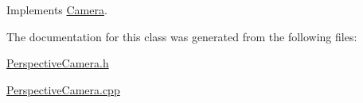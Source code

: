 Implements \hyperlink{classCamera_a8f4824f47acc2ef1b7724e7412abc2da}{Camera}.



The documentation for this class was generated from the following files\+:\begin{DoxyCompactItemize}
\item 
\hyperlink{PerspectiveCamera_8h}{Perspective\+Camera.\+h}\item 
\hyperlink{PerspectiveCamera_8cpp}{Perspective\+Camera.\+cpp}\end{DoxyCompactItemize}
